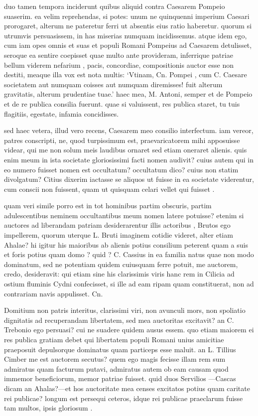  duo tamen tempora inciderunt quibus aliquid contra Caesarem Pompeio suaserim. ea velim reprehendas, si potes: unum ne quinquenni imperium Caesari prorogaret, alterum ne pateretur ferri ut absentis eius ratio haberetur. quorum si utrumvis persuasissem, in has miserias numquam incidissemus. atque idem ego, cum iam opes omnis et suas et populi Romani Pompeius ad Caesarem detulisset, seroque ea sentire coepisset quae multo ante provideram, inferrique patriae bellum viderem nefarium , pacis, concordiae, compositionis auctor esse non destiti, meaque illa vox est nota multis: `Vtinam, Cn. Pompei , cum C. Caesare societatem aut numquam coisses aut numquam diremisses! fuit alterum gravitatis, alterum prudentiae tuae.' haec mea, M. Antoni, semper et de Pompeio et de re publica consilia fuerunt. quae si valuissent, res publica staret, tu tuis flagitiis, egestate, infamia concidisses.

 sed haec vetera, illud vero recens, Caesarem meo consilio interfectum. iam vereor, patres conscripti, ne, quod turpissimum est, praevaricatorem mihi apposuisse videar, qui me non solum meis laudibus ornaret sed etiam oneraret alienis. quis enim meum in ista societate gloriosissimi facti nomen audivit? cuius autem qui in eo numero fuisset nomen est occultatum? occultatum dico? cuius non statim divolgatum? Citius dixerim iactasse se aliquos ut fuisse in ea societate viderentur, cum conscii non fuissent, quam ut quisquam celari vellet qui fuisset .

 quam veri simile porro est in tot hominibus partim obscuris, partim adulescentibus neminem occultantibus meum nomen latere potuisse? etenim si auctores ad liberandam patriam desiderarentur illis actoribus , Brutos ego impellerem, quorum uterque L. Bruti imaginem cotidie videret, alter etiam Ahalae? hi igitur his maioribus ab alienis potius consilium peterent quam a suis et foris potius quam domo ? quid ? C. Cassius in ea familia natus quae non modo dominatum, sed ne potentiam quidem cuiusquam ferre potuit, me auctorem, credo, desideravit: qui etiam sine his clarissimis viris hanc rem in Cilicia ad ostium fluminis Cydni confecisset, si ille ad eam ripam quam constituerat, non ad contrariam navis appulisset. Cn.

 Domitium non patris interitus, clarissimi viri, non avunculi mors, non spoliatio dignitatis ad recuperandam libertatem, sed mea auctoritas excitavit? an C. Trebonio ego persuasi? cui ne suadere quidem ausus essem. quo etiam maiorem ei res publica gratiam debet qui libertatem populi Romani unius amicitiae praeposuit depulsorque dominatus quam particeps esse maluit. an L. Tillius Cimber me est auctorem secutus? quem ego magis fecisse illam rem sum admiratus quam facturum putavi, admiratus autem ob eam causam quod immemor beneficiorum, memor patriae fuisset. quid duos Servilios —Cascas dicam an Ahalas?—et hos auctoritate mea censes excitatos potius quam caritate rei publicae? longum est persequi ceteros, idque rei publicae praeclarum fuisse tam multos, ipsis gloriosum .


